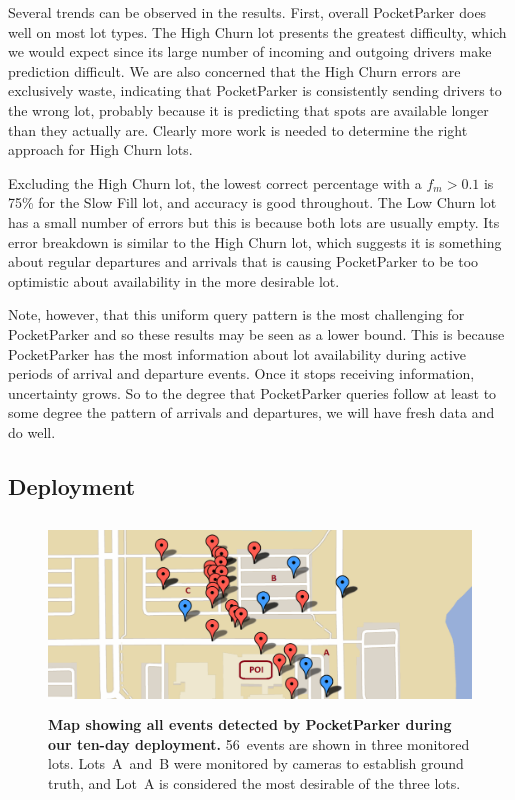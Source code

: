 Several trends can be observed in the results. First, overall PocketParker
does well on most lot types. The High Churn lot presents the greatest
difficulty, which we would expect since its large number of incoming and
outgoing drivers make prediction difficult. We are also concerned that the
High Churn errors are exclusively waste, indicating that PocketParker is
consistently sending drivers to the wrong lot, probably because it is
predicting that spots are available longer than they actually are. Clearly
more work is needed to determine the right approach for High Churn lots.

Excluding the High Churn lot, the lowest correct percentage with a $f_m >
0.1$ is 75\% for the Slow Fill lot, and accuracy is good throughout. The Low
Churn lot has a small number of errors but this is because both lots are
usually empty. Its error breakdown is similar to the High Churn lot, which
suggests it is something about regular departures and arrivals that is
causing PocketParker to be too optimistic about availability in the more
desirable lot.

Note, however, that this uniform query pattern is the most challenging for
PocketParker and so these results may be seen as a lower bound. This is
because PocketParker has the most information about lot availability during
active periods of arrival and departure events. Once it stops receiving
information, uncertainty grows. So to the degree that PocketParker queries
follow at least to some degree the pattern of arrivals and departures, we
will have fresh data and do well.

\subsection{Deployment}

\begin{figure}
\centering
\includegraphics[width=\textwidth,height=2in]{./figures/detectedEventsOnMap.pdf}

\caption{\textbf{Map showing all events detected by PocketParker during our
ten-day deployment.} 56~events are shown in three monitored lots.
Lots~A~and~B were monitored by cameras to establish ground truth, and Lot~A
is considered the most desirable of the three lots.}

\label{fig-events}
\end{figure}

